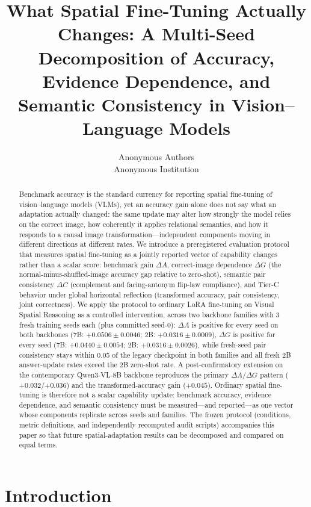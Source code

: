 \documentclass[10pt,twocolumn,letterpaper]{article}
\title{What Spatial Fine-Tuning Actually Changes: A Multi-Seed Decomposition of Accuracy, Evidence Dependence, and Semantic Consistency in Vision--Language Models}
\author{Anonymous Authors\\
Anonymous Institution}
\newcommand{\qwennew}{Qwen3-VL-8B}
\newcommand{\dA}{$\Delta A$}
\newcommand{\dG}{$\Delta G$}
\newcommand{\dC}{$\Delta C$}
\begin{document}
\maketitle

\begin{abstract}
Benchmark accuracy is the standard currency for reporting spatial fine-tuning of vision--language models (VLMs), yet an accuracy gain alone does not say what an adaptation actually changed: the same update may alter how strongly the model relies on the correct image, how coherently it applies relational semantics, and how it responds to a causal image transformation---independent components moving in different directions at different rates. We introduce a preregistered evaluation protocol that measures spatial fine-tuning as a jointly reported vector of capability changes rather than a scalar score: benchmark gain \dA{}, correct-image dependence \dG{} (the normal-minus-shuffled-image accuracy gap relative to zero-shot), semantic pair consistency \dC{} (complement and facing-antonym flip-law compliance), and Tier-C behavior under global horizontal reflection (transformed accuracy, pair consistency, joint correctness). We apply the protocol to ordinary LoRA fine-tuning on Visual Spatial Reasoning as a controlled intervention, across two backbone families with 3 fresh training seeds each (plus committed seed-0): \dA{} is positive for every seed on both backbones (7B: $+0.0506\pm0.0046$; 2B: $+0.0316\pm0.0009$), \dG{} is positive for every seed (7B: $+0.0440\pm0.0054$; 2B: $+0.0316\pm0.0026$), while fresh-seed pair consistency stays within 0.05 of the legacy checkpoint in both families and all fresh 2B answer-update rates exceed the 2B zero-shot rate. A post-confirmatory extension on the contemporary \qwennew{} backbone reproduces the primary \dA{}/\dG{} pattern ($+0.032$/$+0.036$) and the transformed-accuracy gain ($+0.045$). Ordinary spatial fine-tuning is therefore not a scalar capability update: benchmark accuracy, evidence dependence, and semantic consistency must be measured---and reported---as one vector whose components replicate across seeds and families. The frozen protocol (conditions, metric definitions, and independently recomputed audit scripts) accompanies this paper so that future spatial-adaptation results can be decomposed and compared on equal terms.
\end{abstract}

\section{Introduction}

\end{document}
